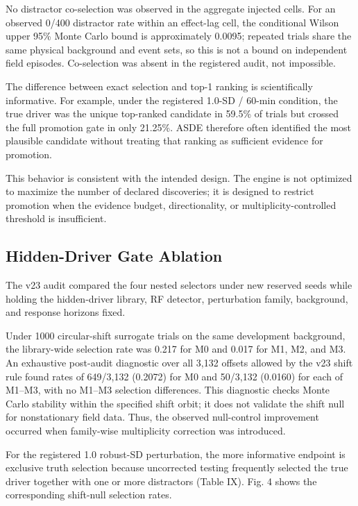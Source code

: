\documentclass{ieeeaccess}
\begin{document}
No distractor co-selection was observed in the aggregate injected cells. For an observed 0/400 distractor rate within an effect-lag cell, the conditional Wilson upper 95\% Monte Carlo bound is approximately 0.0095; repeated trials share the same physical background and event sets, so this is not a bound on independent field episodes. Co-selection was absent in the registered audit, not impossible.

The difference between exact selection and top-1 ranking is scientifically informative. For example, under the registered 1.0-SD / 60-min condition, the true driver was the unique top-ranked candidate in 59.5\% of trials but crossed the full promotion gate in only 21.25\%. ASDE therefore often identified the most plausible candidate without treating that ranking as sufficient evidence for promotion.

This behavior is consistent with the intended design. The engine is not optimized to maximize the number of declared discoveries; it is designed to restrict promotion when the evidence budget, directionality, or multiplicity-controlled threshold is insufficient.

\subsection{Hidden-Driver Gate Ablation}\label{hidden-driver-gate-ablation-1}

The v23 audit compared the four nested selectors under new reserved seeds while holding the hidden-driver library, RF detector, perturbation family, background, and response horizons fixed.

Under 1000 circular-shift surrogate trials on the same development background, the library-wide selection rate was 0.217 for M0 and 0.017 for M1, M2, and M3. An exhaustive post-audit diagnostic over all 3,132 offsets allowed by the v23 shift rule found rates of 649/3,132 (0.2072) for M0 and 50/3,132 (0.0160) for each of M1--M3, with no M1--M3 selection differences. This diagnostic checks Monte Carlo stability within the specified shift orbit; it does not validate the shift null for nonstationary field data. Thus, the observed null-control improvement occurred when family-wise multiplicity correction was introduced.

For the registered 1.0 robust-SD perturbation, the more informative endpoint is exclusive truth selection because uncorrected testing frequently selected the true driver together with one or more distractors (Table IX). Fig. 4 shows the corresponding shift-null selection rates.
\end{document}
